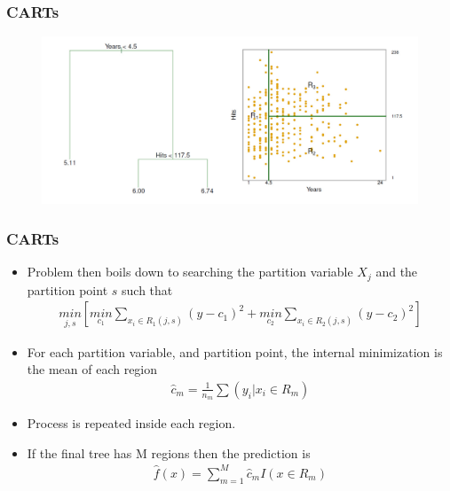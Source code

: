 \documentclass[
  shownotes,
  xcolor={svgnames},
  hyperref={colorlinks,citecolor=DarkBlue,linkcolor=DarkRed,urlcolor=DarkBlue}
  , aspectratio=169]{beamer}
\begin{document}
\begin{frame}
\frametitle{CARTs}



\begin{figure}[H] \centering
            \captionsetup{justification=centering}
              \includegraphics[scale=0.4]{figures/hitters.png}                           
 \end{figure}


\end{frame}
\begin{frame}
\frametitle{CARTs}

\begin{itemize}
  \item Problem then boils down to searching the partition variable $X_j$ and the partition point $s$ such that
    \begin{align}
    \underset{j,s}{min} \left[ \underset{c_1}{min}\sum_{x_i\in R_1(j,s)}(y-c_1)^2+ \underset{c_2}{min}\sum_{x_i\in R_2(j,s)}(y-c_2)^2\right]
    \end{align}

  \item For each partition variable, and partition point, the internal minimization is the mean of each region
  \begin{align}
   \hat{c}_m =\frac{1}{n_m} \sum(y_i|x_i \in R_m)
  \end{align}
  \item Process is repeated inside each region. 
  \pause
  \item If the final tree has M regions then the prediction is 
  \begin{align}
  \hat{f}(x) = \sum_{m=1}^M \hat{c}_m I(x \in R_m)
  \end{align}

\end{itemize}

\end{frame}
\end{document}
